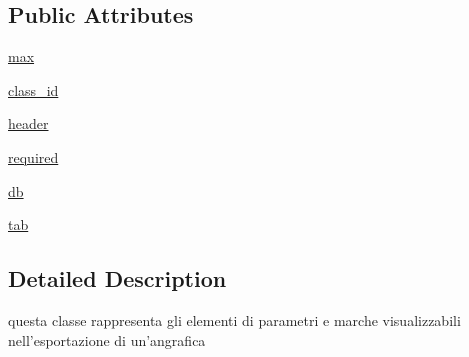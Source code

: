 \subsection*{Public Attributes}
\begin{DoxyCompactItemize}
\item 
\hyperlink{classmmasgis_1_1EntityElements_1_1EntityElement_a58444248f21286d675200e8ddba22241}{max}
\item 
\hyperlink{classmmasgis_1_1EntityElements_1_1EntityElement_a33e6a66eb4d7985c7c006e346df1fec9}{class\_\-id}
\item 
\hyperlink{classmmasgis_1_1EntityElements_1_1EntityElement_a43d5dea07086b17ca68cb5796ee7ba25}{header}
\item 
\hyperlink{classmmasgis_1_1EntityElements_1_1EntityElement_ae276e4fbf7fc39527c032c4228daea28}{required}
\item 
\hyperlink{classmmasgis_1_1EntityElements_1_1EntityElement_a244a7b0e3084bfae13d8b6e3f5065789}{db}
\item 
\hyperlink{classmmasgis_1_1EntityElements_1_1EntityElement_a9c56d11fcd1412af7ead9c43a27f92dd}{tab}
\end{DoxyCompactItemize}


\subsection{Detailed Description}
\begin{DoxyVerb}
questa classe rappresenta gli elementi di parametri e marche
 visualizzabili nell'esportazione di un'angrafica
\end{DoxyVerb}
 

